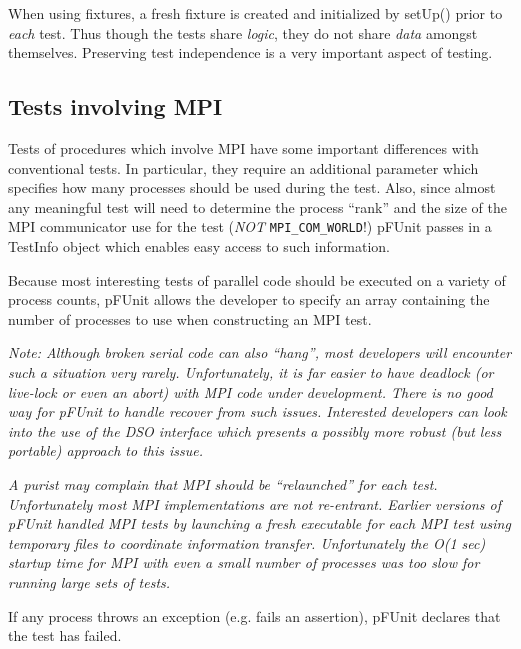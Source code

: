 \documentclass[10pt]{article}
\newcommand{\pfunit}{{\sc pFUnit }}
\begin{document}
When using fixtures, a fresh fixture is created and initialized by
setUp() prior to \emph{each} test.  Thus though the tests share
\emph{logic}, they do not share \emph{data} amongst themselves.
Preserving test independence is a very important aspect of testing.

\subsection{Tests involving MPI}

Tests of procedures which involve MPI have some important differences
with conventional tests.  In particular, they require an additional
parameter which specifies how many processes should be used during the
test.  Also, since almost any meaningful test will need to determine
the process ``rank'' and the size of the MPI communicator use for the
test (\emph{NOT} \verb+MPI_COM_WORLD+!) \pfunit passes in a TestInfo
object which enables easy access to such information.

Because most interesting tests of parallel code should be executed on
a variety of process counts, \pfunit allows the developer to specify an array
containing the number of processes to use when constructing an MPI test.

\hspace{0.1in}
\emph{ Note: Although broken serial code can also ``hang'', most developers
  will encounter such a situation very rarely.  Unfortunately, it is
  far easier to have deadlock (or live-lock or even an abort) with MPI
  code under development.  There is no good way for \pfunit to handle
  recover from such issues.  Interested developers can look into the use of the DSO
  interface which presents a possibly more robust (but less portable)
  approach to this issue.}

\hspace{0.1in}
\emph{ A purist may complain that MPI should be ``relaunched'' for
  each test. Unfortunately most MPI implementations are not
  re-entrant. Earlier versions of \pfunit handled MPI tests by
  launching a fresh executable for each MPI test using temporary files to
  coordinate information transfer.  Unfortunately the O(1 sec) startup
  time for MPI with even a small number of processes was too slow for
  running large sets of tests.}

If any process throws an exception (e.g. fails an assertion), \pfunit
declares that the test has failed.


\end{document}
